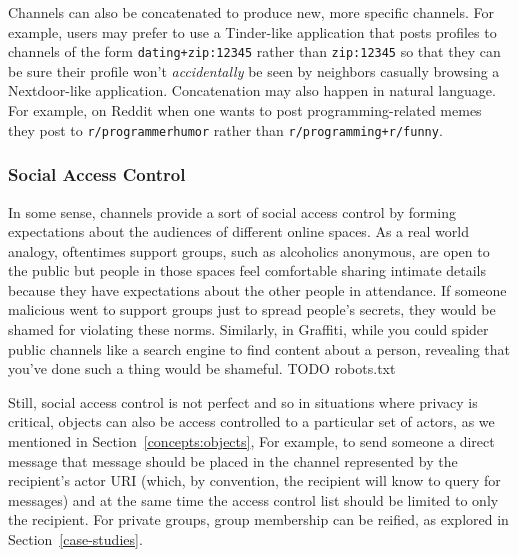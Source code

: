 Channels can also be concatenated to produce new, more specific channels.
For example, users may prefer to use a Tinder-like application that posts
profiles to channels of the form \texttt{dating+zip:12345} rather than
\texttt{zip:12345} so that they can be sure their profile won't
\emph{accidentally} be seen by neighbors casually browsing a Nextdoor-like application.
Concatenation may also happen in natural language.
For example, on Reddit when one wants to post programming-related memes they post to \texttt{r/programmerhumor} rather than \texttt{r/programming+\allowbreak{}r/funny}.




\subsubsection{Social Access Control}

In some sense, channels provide a sort of social access control by forming
expectations about the audiences of different online spaces.
As a real world analogy, oftentimes support groups, such as alcoholics
anonymous, are open to the public but people in those spaces feel comfortable sharing intimate details
because they have expectations about the other people in attendance.
If someone malicious went to support groups just to spread people's secrets,
they would be shamed for violating these norms.
Similarly, in Graffiti, while you could spider public channels like a search engine
to find content about a person, revealing that you've done such a thing
would be shameful.
TODO robots.txt

Still, social access control is not perfect and so in situations where privacy is critical,
objects can also be access controlled to a particular set of actors,
as we mentioned in Section~\ref{concepts:objects},
For example, to send someone a direct message that message should be placed in
the channel represented by the recipient's actor URI (which, by convention,
the recipient will know to query for messages) and at the same time the
access control list should be limited to only the recipient.
For private groups, group membership can be reified, as explored in Section~\ref{case-studies}.
